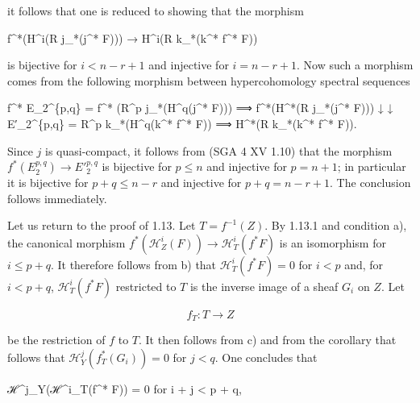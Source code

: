 \documentclass[
  11pt,
  a4paper,
]{book}
\newenvironment{Shaded}{}{}
\newcommand{\NormalTok}[1]{#1}
\begin{document}
it follows that one is reduced to showing that the morphism

\begin{Shaded}
\begin{Highlighting}[]
\NormalTok{f\^{}*(H\^{}i(R j\_*(j\^{}* F))) → H\^{}i(R k\_*(k\^{}* f\^{}* F))}
\end{Highlighting}
\end{Shaded}

is bijective for \(i < n - r + 1\) and injective for \(i = n - r + 1\).
Now such a morphism comes from the following morphism between
hypercohomology spectral sequences

\begin{Shaded}
\begin{Highlighting}[]
\NormalTok{f\^{}* E\_2\^{}\{p,q\} = f\^{}* (R\^{}p j\_*(H\^{}q(j\^{}* F)))     ⟹ f\^{}*(H\^{}*(R j\_*(j\^{}* F)))}
\NormalTok{       ↓                                         ↓}
\NormalTok{E′\_2\^{}\{p,q\} = R\^{}p k\_*(H\^{}q(k\^{}* f\^{}* F))           ⟹ H\^{}*(R k\_*(k\^{}* f\^{}* F)).}
\end{Highlighting}
\end{Shaded}

Since \(j\) is quasi-compact, it follows from (SGA 4 XV 1.10) that the
morphism \(f^{*}(E^{p,q}_{2}) \to E'^{p,q}_{2}\) is bijective for
\(p \leqslant n\) and injective for \(p = n + 1\); in particular it is
bijective for \(p + q \leqslant n - r\) and injective for
\(p + q = n - r + 1\). The conclusion follows immediately.

Let us return to the proof of 1.13. Let \(T = f^{-1}(Z)\). By 1.13.1 and
condition a), the canonical morphism
\(f^{*}(\mathcal{H}^{i}_{Z}(F)) \to \mathcal{H}^{i}_{T}(f^{*} F)\) is an
isomorphism for \(i \leqslant p + q\). It therefore follows from b) that
\(\mathcal{H}^{i}_{T}(f^{*} F) = 0\) for \(i < p\) and, for
\(i < p + q\), \(\mathcal{H}^{i}_{T}(f^{*} F)\) restricted to \(T\) is
the inverse image of a sheaf \(G_{i}\) on \(Z\). Let

\[ f_{T} : T \to Z \]

be the restriction of \(f\) to \(T\). It then follows from c) and from
the corollary that follows that
\(\mathcal{H}^{j}_{Y}(f^{*}_{T}(G_{i})) = 0\) for \(j < q\). One
concludes that

\begin{Shaded}
\begin{Highlighting}[]
\NormalTok{ℋ\^{}j\_Y(ℋ\^{}i\_T(f\^{}* F)) = 0 for i + j \textless{} p + q,}
\end{Highlighting}
\end{Shaded}
\end{document}
